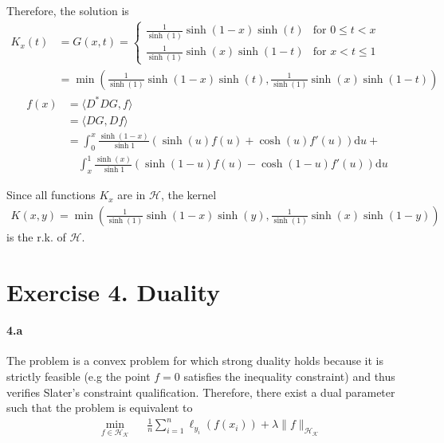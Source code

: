 \documentclass[10pt]{article}
\begin{document}
    Therefore, the solution is 
    \begin{align*}
    K_x(t) &= G(x, t) = \begin{cases}
        \frac{1}{\sinh(1)}\sinh(1-x)\sinh(t)  & \text{for } 0\leq t < x\\
        \frac{1}{\sinh(1)}\sinh(x)\sinh(1 - t)& \text{for } x < t\leq 1
    \end{cases}\\
    & = \min\left(\frac{1}{\sinh(1)}\sinh(1-x)\sinh(t), 
    \frac{1}{\sinh(1)}\sinh(x)\sinh(1 - t)\right) 
    \end{align*}
    \begin{align*}
        f(x) &= \langle D^* D G, f \rangle\\
        & = \langle  D G, Df \rangle  \\
        &= \int_0^x \frac{\sinh(1-x)}{\sinh 1} 
        (\sinh(u)f(u) + \cosh(u)f'(u ) )\text{d}u + \\
        &\quad \int_x^1  \frac{\sinh(x)}{\sinh 1} 
        (\sinh(1-u)f(u) - \cosh(1- u)f'(u))\text{d}u
    \end{align*}

    Since all functions $K_x$ are in $\mathcal{H}$, the kernel 
    \begin{align*}
        K(x, y) = \min\left(\frac{1}{\sinh(1)}\sinh(1-x)\sinh(y), 
        \frac{1}{\sinh(1)}\sinh(x)\sinh(1 - y)\right) 
    \end{align*}
    is the r.k. of $\mathcal{H}$.
    \section*{Exercise 4. Duality}
    \paragraph{4.a} The problem is a convex problem for which strong duality 
    holds because it is strictly feasible (e.g the point $f=0$ satisfies the
    inequality constraint) and thus verifies Slater’s constraint qualification. 
    Therefore, there exist a dual parameter such that the problem is equivalent 
    to 
    \begin{equation*}
        \begin{aligned}
        & \underset{f\in\mathcal{H}_\mathcal{K}}{\text{min}}
        & & \frac{1}{n}\sum_{i=1}^n \ell_{y_i}(f(x_i)) + \lambda \lVert f
        \rVert_{\mathcal{H}_\mathcal{K}}\\
        \end{aligned}
    \end{equation*}
\end{document}
